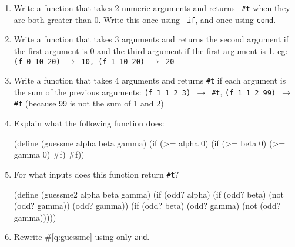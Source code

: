 \documentclass[pdftex,11pt]{article}
\begin{document}
\begin{enumerate}
\begin{minipage}{0.5\textwidth}
\begin{answer}
\underline{                         }
\end{answer}
\end{minipage}

\item Write a function that takes 2 numeric arguments and returns {\tt
    \#t} when they are both greater than 0. Write this once using {\tt
    if}, and once using {\tt cond}.
\vspace{2in}

\item Write a function that takes 3 arguments and returns the second
  argument if the first argument is 0 and the third argument if the
  first argument is 1. eg: {\tt (f 0 10 20) $\rightarrow$ 10, (f 1 10
    20) $\rightarrow$ 20}
\vspace{1in}

\item Write a function that takes 4 arguments and returns {\tt \#t} if
  each argument is the sum of the previous arguments: {\tt (f 1 1 2 3)
    $\rightarrow$ \#t}, {\tt (f 1 1 2 99) $\rightarrow$ \#f} (because
  99 is not the sum of 1 and 2) \vspace{1.25in}

\item \label{q:guessme} Explain what the following function does:
\begin{answer}
(define (guessme alpha beta gamma)
  (if (>= alpha 0)
      (if (>= beta 0) (>= gamma 0) #f)
      #f))
\end{answer}
\vspace{.5in}

\item For what inputs does this function return {\tt \#t}?
\begin{answer}
(define (guessme2 alpha beta gamma)
  (if (odd? alpha)
      (if (odd? beta) (not (odd? gamma)) (odd? gamma))
      (if (odd? beta) (odd? gamma) (not (odd? gamma)))))
\end{answer}
\vspace{.5in}

\item Rewrite \#\ref{q:guessme} using only {\tt and}.
\end{enumerate}
\end{document}
